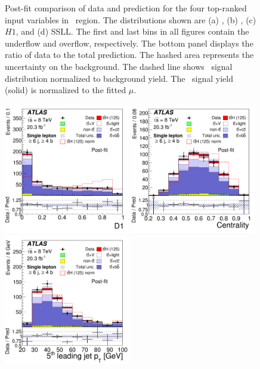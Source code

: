 \begin{figure}[tp]
\begin{center}
\caption{Post-fit comparison of data and prediction for the four top-ranked input variables in 
\sixthree\ region. The distributions shown are (a) \numjetforty, (b) \cent, (c) $H1$, 
and (d) SSLL.
The first and last bins in all figures contain the underflow and
overflow, respectively. The bottom panel displays the ratio of 
data to the total prediction. The hashed area represents the uncertainty on the background.
The dashed line shows \tth\ signal
distribution normalized to background yield. The \tth\ signal yield (solid) 
is normalized to the fitted $\mu$.}
\label{fig:postinput_lj_2} 
\end{center}
\end{figure}

\begin{figure}[tp]
\begin{center}
\includegraphics[width=0.49\textwidth]{Appendices/Figures_separation/ME_D1_6jincl.pdf}
\includegraphics[width=0.49\textwidth]{Appendices/Figures_separation/cent_6jincl.pdf} \\
\includegraphics[width=0.49\textwidth]{Appendices/Figures_separation/jet5_pt_6jincl.pdf}

\end{center}
\end{figure}
